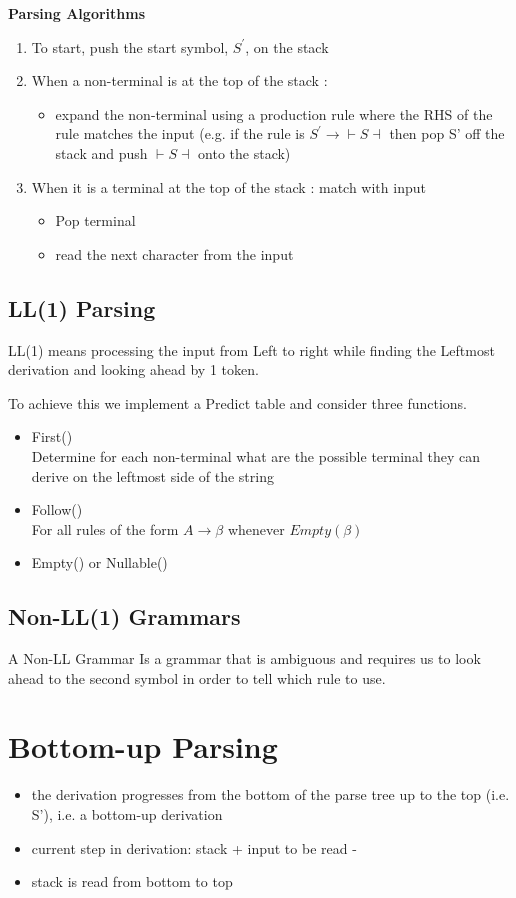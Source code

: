 \documentclass{article}
\begin{document}
\textbf{Parsing Algorithms}
\begin{enumerate}
\item To start, push the start symbol, \(S^\prime\), on the stack
\item When a non-terminal is at the top of the stack : 
\begin{itemize}
\item expand the non-terminal using a production rule where the
RHS of the rule matches the input (e.g. if the rule is \(S^\prime \rightarrow  \vdash S \dashv \)
then pop S’ off the stack and push \(\vdash S \dashv\) onto the stack)
\end{itemize}
\item When it is a terminal at the top of the stack : match with input 
\begin{itemize}
\item Pop terminal 
\item read the next character from the input 
\end{itemize}
\end{enumerate}

\subsection*{LL(1) Parsing}
LL(1) means processing the input from Left to right while finding the Leftmost derivation and looking ahead by 1 token. 

To achieve this we implement a Predict table and consider three functions. \
\begin{itemize}
\item First()\\
Determine for each non-terminal what are the possible terminal they can derive on the leftmost side of the string
\item Follow()\\
For all rules of the form \(A \rightarrow \beta\) whenever \(Empty(\beta)\)
\item Empty() or Nullable()
\end{itemize} 

\subsection*{Non-LL(1) Grammars}
A Non-LL Grammar Is a grammar that is ambiguous and requires us to look ahead to the second symbol in order to tell which rule to use. 

\section{Bottom-up Parsing}
\begin{itemize}
\item the derivation progresses from the bottom of the parse tree
up to the top (i.e. S’), i.e. a bottom-up derivation
\item current step in derivation: stack + input to be read
-\item stack is read from bottom to top
\end{itemize}
\end{document}
